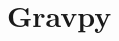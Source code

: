 \documentclass{kentigern}
\theoremstyle{definition}
\begin{document}



\appendices
\chapter{Gravpy}
\label{app:gravpy}


\printglossary

\medskip
\printbibliography[title={Bibliography}]
\end{document}
